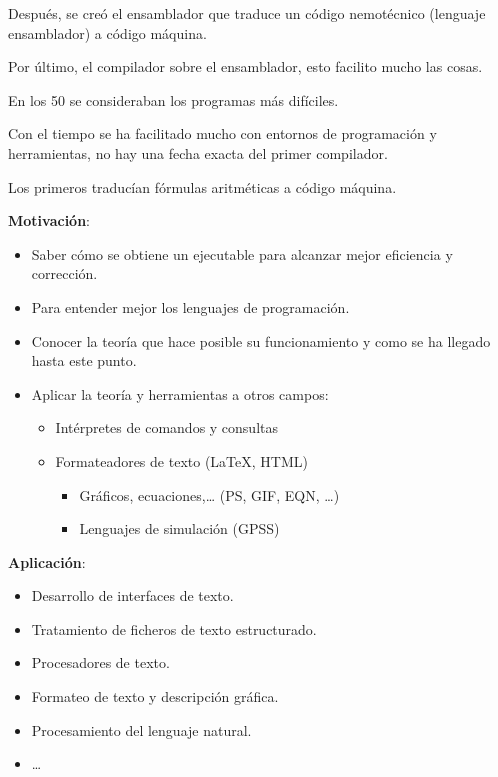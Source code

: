 \documentclass[12pt, twoside, openright]{report} %
\begin{document}
Después, se creó el ensamblador que traduce un código nemotécnico
(lenguaje ensamblador) a código máquina.

Por último, el compilador sobre el ensamblador, esto facilito mucho las
cosas.

En los 50 se consideraban los programas más difíciles.

Con el tiempo se ha facilitado mucho con entornos de programación y
herramientas, no hay una fecha exacta del primer compilador.

Los primeros traducían fórmulas aritméticas a código máquina.

\textbf{Motivación}:

\begin{itemize}

\item
  Saber cómo se obtiene un ejecutable para alcanzar mejor eficiencia y
  corrección.
\item
  Para entender mejor los lenguajes de programación.
\item
  Conocer la teoría que hace posible su funcionamiento y como se ha
  llegado hasta este punto.
\item
  Aplicar la teoría y herramientas a otros campos:

  \begin{itemize}
  
  \item
    Intérpretes de comandos y consultas
  \item
    Formateadores de texto (LaTeX, HTML)

    \begin{itemize}
    
    \item
      Gráficos, ecuaciones,\ldots{} (PS, GIF, EQN, \ldots)
    \item
      Lenguajes de simulación (GPSS)
    \end{itemize}
  \end{itemize}
\end{itemize}

\textbf{Aplicación}:

\begin{itemize}

\item
  Desarrollo de interfaces de texto.
\item
  Tratamiento de ficheros de texto estructurado.
\item
  Procesadores de texto.
\item
  Formateo de texto y descripción gráfica.
\item
  Procesamiento del lenguaje natural.
\item
  \ldots{}
\end{itemize}
\end{document}
